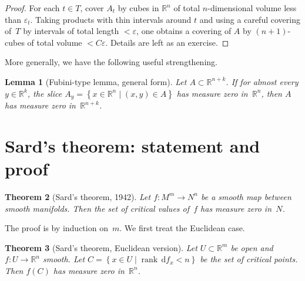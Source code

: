 \documentclass[12pt,a4paper,openany]{book}
\newtheorem{theorem}{Theorem}[section]
\newtheorem{lemma}[theorem]{Lemma}
\theoremstyle{definition}
\theoremstyle{remark}
\newcommand{\R}{\mathbb{R}}
\newcommand{\dd}{\,\mathrm{d}}
\newcommand{\set}[1]{\left\{ #1 \right\}}
\begin{document}
\begin{proof}
For each $t\in T$, cover $A_t$ by cubes in $\R^n$ of total
$n$-dimensional volume less than $\varepsilon_t$.  Taking products
with thin intervals around $t$ and using a careful covering of~$T$
by intervals of total length $<\varepsilon$, one obtains a covering
of $A$ by $(n+1)$-cubes of total volume $<C\varepsilon$.  Details
are left as an exercise.
\end{proof}

More generally, we have the following useful strengthening.

\begin{lemma}[Fubini-type lemma, general form]\label{lem:fubini-general}
Let $A\subset\R^{n+k}$.  If for almost every $y\in\R^k$, the slice
$A_y = \set{x\in\R^n \mid (x,y)\in A}$ has measure zero in~$\R^n$,
then $A$ has measure zero in~$\R^{n+k}$.
\end{lemma}

\section{Sard's theorem: statement and proof}\label{sec:sard-proof}

\begin{theorem}[Sard's theorem, 1942]\label{thm:sard}
Let $f\colon M^m\to N^n$ be a smooth map between smooth manifolds.
Then the set of critical values of~$f$ has measure zero in~$N$.
\end{theorem}

The proof is by induction on~$m$.  We first treat the Euclidean case.

\begin{theorem}[Sard's theorem, Euclidean version]\label{thm:sard-euclidean}
Let $U\subset\R^m$ be open and $f\colon U\to\R^n$ smooth.  Let
$C = \set{x\in U\mid \operatorname{rank}\dd f_x < n}$ be the set of
critical points.  Then $f(C)$ has measure zero in~$\R^n$.
\end{theorem}
\end{document}
